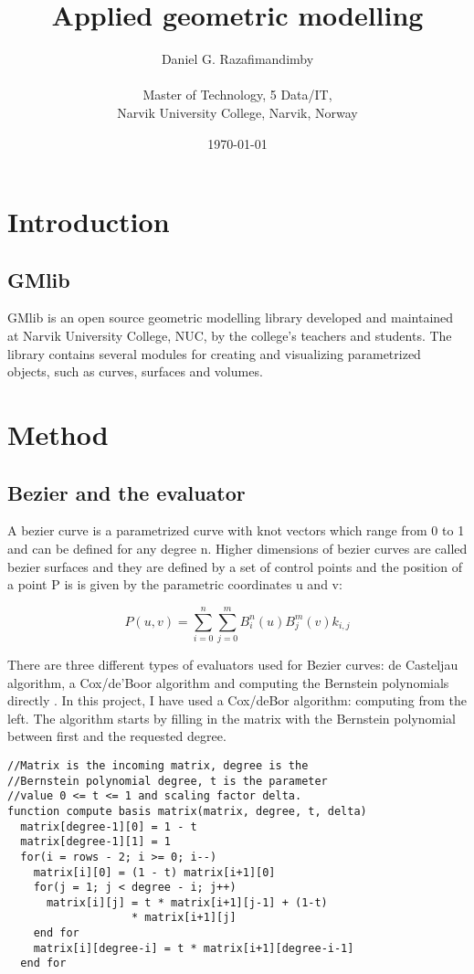 \documentclass[a4paper,11pt]{article}
\title{Applied geometric modelling}
\author{
Daniel G. Razafimandimby \\ \\
Master of Technology, 5 Data/IT, \\
Narvik University College, Narvik, Norway
}
\date{\today}
\begin{document}
\maketitle
\begin{abstract}
\end{abstract}
\section{Introduction}
\subsection{GMlib}
GMlib is an open source geometric modelling library developed and maintained at Narvik University College, NUC, by the college's teachers and students. The library contains several modules for creating and visualizing parametrized objects, such as curves, surfaces and volumes.

\section{Method}
\subsection{Bezier and the evaluator}
A bezier curve is a parametrized curve with knot vectors which range from 0 to 1 and can be defined for any degree n. Higher dimensions of bezier curves are called bezier surfaces and they are defined by a set of control points and the position of a point P is is given by the parametric coordinates u and v: 


\begin{equation} \label{eq:BezierPPoint}
P(u, v) = \sum_{i=0}^{n}\sum_{j=0}^{m} B_{i}^{n}(u) B_{j}^{m}(v)k_{i,j}
\end{equation}

There are three different types of evaluators used for Bezier curves: de Casteljau algorithm, a Cox/de'Boor algorithm and computing the Bernstein polynomials directly \cite{art_ierbs}. In this project, I have used a Cox/deBor algorithm: computing from the left. The algorithm starts by filling in the matrix with the Bernstein polynomial between first and the requested degree.

\label{fig:bezierEval1}
\begin{lstlisting}[frame=single, caption={Assigning the top half of the matrix.}] 
//Matrix is the incoming matrix, degree is the 
//Bernstein polynomial degree, t is the parameter
//value 0 <= t <= 1 and scaling factor delta.
function compute basis matrix(matrix, degree, t, delta)
  matrix[degree-1][0] = 1 - t
  matrix[degree-1][1] = 1
  for(i = rows - 2; i >= 0; i--)
    matrix[i][0] = (1 - t) matrix[i+1][0]
    for(j = 1; j < degree - i; j++)
      matrix[i][j] = t * matrix[i+1][j-1] + (1-t)
                   * matrix[i+1][j]
    end for
    matrix[i][degree-i] = t * matrix[i+1][degree-i-1]
  end for
\end{lstlisting}
\end{document}
